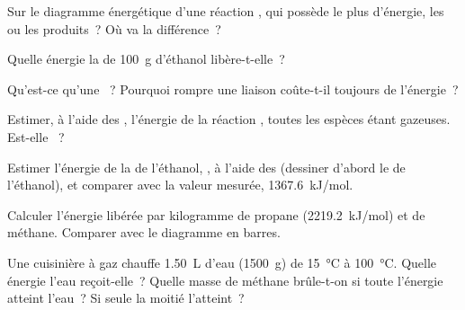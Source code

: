 \begin{exercise}[$\star$]\label{exo:g11:reaction-energy:3}
Sur le diagramme énergétique d'une réaction , qui possède le
plus d'énergie, les  ou les produits~? Où va la différence~?
\end{exercise}

\begin{exercise}[$\star$]\label{exo:g11:reaction-energy:4}
Quelle énergie la  de \qty{100}{g} d'éthanol
libère-t-elle~?
\end{exercise}

\begin{exercise}[$\star$]\label{exo:g11:reaction-energy:5}
Qu'est-ce qu'une ~? Pourquoi rompre une liaison
coûte-t-il toujours de l'énergie~?
\end{exercise}

\begin{exercise}[$\star\star$]\label{exo:g11:reaction-energy:6}
Estimer, à l'aide des , l'énergie de la réaction
, toutes les espèces étant gazeuses. Est-elle
~?
\end{exercise}

\begin{exercise}[$\star\star$]\label{exo:g11:reaction-energy:7}
Estimer l'énergie de la  de l'éthanol, , à l'aide des  (dessiner d'abord le
 de l'éthanol), et comparer avec la valeur mesurée,
\qty{1367.6}{kJ/mol}.
\end{exercise}

\begin{exercise}[$\star\star$]\label{exo:g11:reaction-energy:8}
Calculer l'énergie libérée par kilogramme de propane
(\qty{2219.2}{kJ/mol}) et de méthane. Comparer avec le diagramme en
barres.
\end{exercise}

\begin{exercise}[$\star\star$]\label{exo:g11:reaction-energy:9}
Une cuisinière à gaz chauffe \qty{1.50}{L} d'eau (\qty{1500}{g}) de
\qty{15}{\celsius} à \qty{100}{\celsius}. Quelle énergie l'eau
reçoit-elle~? Quelle masse de méthane brûle-t-on si toute l'énergie
atteint l'eau~? Si seule la moitié l'atteint~?
\end{exercise}

